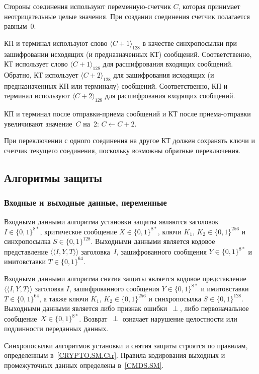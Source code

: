 Стороны соединения используют переменную-счетчик $C$, которая принимает 
неотрицательные целые значения. При создании соединения счетчик 
полагается равным~$0$.

КП и терминал используют слово $\langle C + 1 \rangle_{128}$ в качестве 
синхропосылки при зашифровании исходящих (и предназначенных КТ) сообщений. 
Соответственно, КТ использует слово $\langle C + 1 \rangle_{128}$ для 
расшифрования входящих сообщений. Обратно, КТ использует $\langle C + 2 
\rangle_{128}$ для зашифрования исходящих (и предназначенных КП или 
терминалу) сообщений. Соответственно, КП и терминал используют $\langle C + 2 
\rangle_{128}$ для расшифрования входящих сообщений. 

КП и терминал после отправки-приема сообщений и КТ после приема-отправки 
увеличивают значение~$C$ на~$2$: $C\gets C + 2$.

При переключении с одного соединения на другое КТ должен сохранять ключи и 
счетчик текущего соединения, поскольку возможны обратные переключения.

\subsection{Алгоритмы защиты}\label{CRYPTO.SM.Algs}

\subsubsection{Входные и выходные данные, переменные}
\label{CRYPTO.SM.Algs.InOut}

Входными данными алгоритма установки защиты являются заголовок~$I\in\{0,1\}^{8*}$, 
критическое сообщение $X \in\{0,1\}^{8*}$, 
ключи $K_1$, $K_2\in\{0,1\}^{256}$ и 
синхропосылка $S\in\{0,1\}^{128}$.
Выходными данными является кодовое представление 
$\langle\langle I, Y, T \rangle\rangle$
заголовка~$I$, зашифрованного сообщения $Y \in\{0,1\}^{8*}$ 
и имитовставки $T \in\{0,1\}^{64}$.

Входными данными алгоритма снятия защиты является кодовое представление 
$\langle\langle I, Y, T\rangle\rangle$ заголовка $I$, зашифрованного 
сообщения $Y \in\{0,1\}^{8*}$ и имитовставки $T \in\{0, 1\}^{64}$, а также 
ключи $K_1$, $K_2 \in\{0,1\}^{256}$ и синхропосылка $S \in\{0,1\}^{128}$. 
Выходными данными является либо признак ошибки~$\perp$, либо первоначальное 
сообщение~$X\in\{0,1\}^{8*}$. Возврат~$\perp$ означает нарушение целостности 
или подлинности переданных данных.

Синхропосылки алгоритмов установки и снятия защиты строятся по правилам, 
определенным в~\ref{CRYPTO.SM.Ctr}. Правила кодирования выходных и 
промежуточных данных определены в~\ref{CMDS.SM}.

